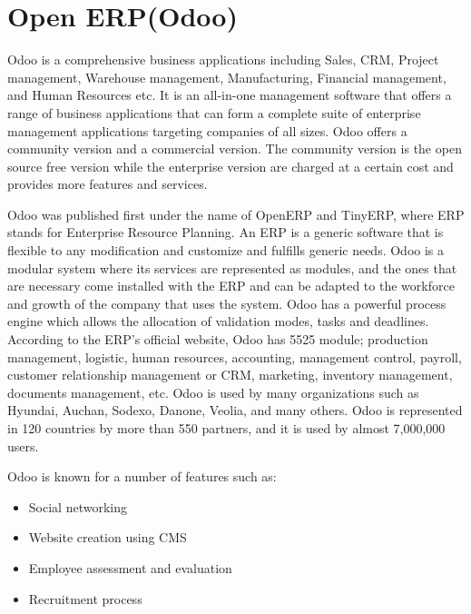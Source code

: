 \section{Open ERP(Odoo)}

Odoo is a comprehensive business applications including Sales, CRM, Project management,
Warehouse management, Manufacturing, Financial management, and Human Resources etc. It is an
all-in-one management software that offers a range of business applications that can form a
complete suite of enterprise management applications targeting companies of all sizes.
Odoo offers a community version and a commercial version. The community version is the open
source free version while the enterprise version are charged at a certain cost and provides more
features and services.

Odoo was published first under the name of OpenERP and TinyERP, where ERP stands for
Enterprise Resource Planning. An ERP is a generic software that is flexible to any modification
and customize and fulfills generic needs. Odoo is a modular system where its services are
represented as modules, and the ones that are necessary come installed with the ERP and can be
adapted to the workforce and growth of the company that uses the system. Odoo has a powerful
process engine which allows the allocation of validation modes, tasks and deadlines. According
to the ERP’s official website, Odoo has 5525 module; production management, logistic, human
resources, accounting, management control, payroll, customer relationship management or CRM,
marketing, inventory management, documents management, etc. Odoo is used by many
organizations such as Hyundai, Auchan, Sodexo, Danone, Veolia, and many others.
Odoo is represented in 120 countries by more than 550 partners, and it is used by almost
7,000,000 users.

Odoo is known for a number of features such as:

\begin{itemize}
	\item Social networking
	\item Website creation using CMS
	\item Employee assessment and evaluation
	\item Recruitment process
\end{itemize}

